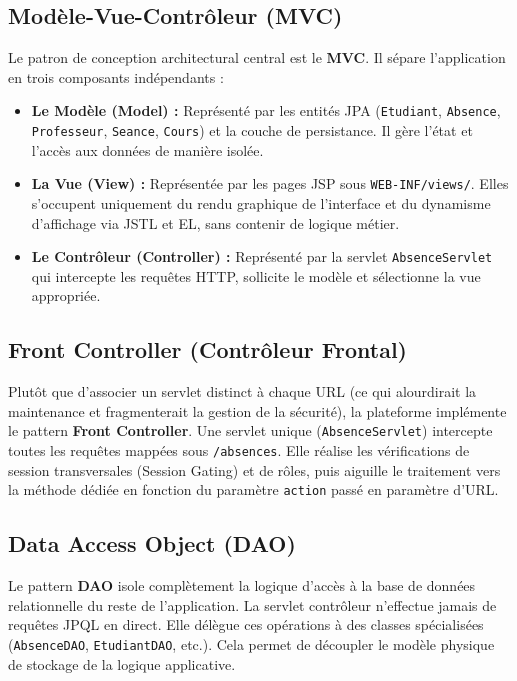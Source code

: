 \documentclass[12pt,a4paper]{article}
\begin{document}
\subsection{Modèle-Vue-Contrôleur (MVC)}
Le patron de conception architectural central est le \textbf{MVC}. Il sépare l'application en trois composants indépendants :
\begin{itemize}
    \item \textbf{Le Modèle (Model) :} Représenté par les entités JPA (\texttt{Etudiant}, \texttt{Absence}, \texttt{Professeur}, \texttt{Seance}, \texttt{Cours}) et la couche de persistance. Il gère l'état et l'accès aux données de manière isolée.
    \item \textbf{La Vue (View) :} Représentée par les pages JSP sous \texttt{WEB-INF/views/}. Elles s'occupent uniquement du rendu graphique de l'interface et du dynamisme d'affichage via JSTL et EL, sans contenir de logique métier.
    \item \textbf{Le Contrôleur (Controller) :} Représenté par la servlet \texttt{AbsenceServlet} qui intercepte les requêtes HTTP, sollicite le modèle et sélectionne la vue appropriée.
\end{itemize}

\subsection{Front Controller (Contrôleur Frontal)}
Plutôt que d'associer un servlet distinct à chaque URL (ce qui alourdirait la maintenance et fragmenterait la gestion de la sécurité), la plateforme implémente le pattern \textbf{Front Controller}. Une servlet unique (\texttt{AbsenceServlet}) intercepte toutes les requêtes mappées sous \texttt{/absences}. Elle réalise les vérifications de session transversales (Session Gating) et de rôles, puis aiguille le traitement vers la méthode dédiée en fonction du paramètre \texttt{action} passé en paramètre d'URL.

\subsection{Data Access Object (DAO)}
Le pattern \textbf{DAO} isole complètement la logique d'accès à la base de données relationnelle du reste de l'application. La servlet contrôleur n'effectue jamais de requêtes JPQL en direct. Elle délègue ces opérations à des classes spécialisées (\texttt{AbsenceDAO}, \texttt{EtudiantDAO}, etc.). Cela permet de découpler le modèle physique de stockage de la logique applicative.
\end{document}
